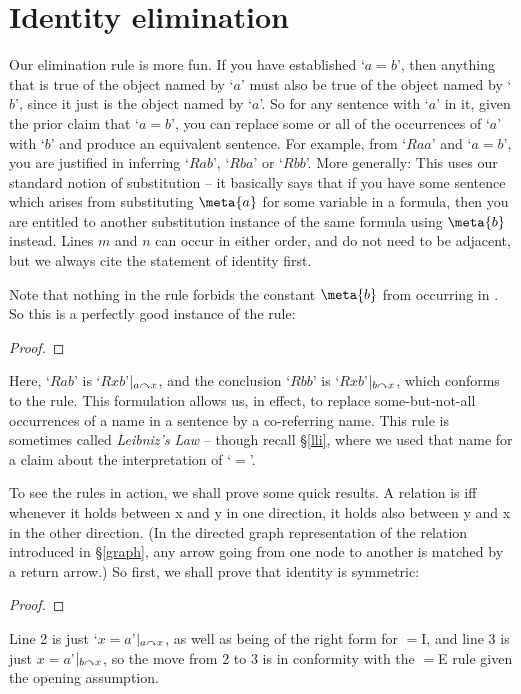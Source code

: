 \section{Identity elimination} %
\label{idelim}


Our elimination rule is more fun. If you have established `$a=b$', then anything that is true of the object named by `$a$' must also be true of the object named by `$b$', since it just is the object named by `$a$'. So for any sentence with `$a$' in it, given the prior claim that `$a=b$', you can replace some or all of the occurrences of `$a$' with `$b$' and produce an equivalent sentence. For example, from `$Raa$' and `$a = b$', you are justified in inferring `$Rab$', `$Rba$' or `$Rbb$'. More generally:
This uses our standard notion of substitution – it basically says that if you have some sentence which arises from substituting $\meta{a}$ for some variable in a formula, then you are entitled to another substitution instance of the same formula using $\meta{b}$ instead. 
 Lines $m$ and $n$ can occur in either order, and do not need to be adjacent, but we always cite the statement of identity first. 

Note that nothing in the rule forbids the constant $\meta{b}$ from occurring in . So this is a perfectly good instance of the rule: \begin{proof}
\end{proof} Here, `$Rab$' is `$Rxb$'$\vert_{a\curvearrowright x}$, and the conclusion `$Rbb$' is `$Rxb$'$\vert_{b\curvearrowright x}$, which conforms to the rule. This formulation allows us, in effect, to replace some-but-not-all occurrences of a name in a sentence by a co-referring name.
This rule is sometimes called \emph{Leibniz's Law} – though recall §\ref{lli}, where we used that name for a claim about the interpretation of `$=$'.


To see the rules in action, we shall prove some quick results. A relation is   iff whenever it holds between x and y in one direction, it holds also between y and x in the other direction. (In the directed graph representation of the relation introduced in §\ref{graph}, any arrow going from one node to another is matched by a return arrow.) So first, we shall prove that identity is symmetric:
\begin{proof}
	\open
		\idi{}
	\close
\end{proof}
Line 2 is just `$x=a$'$\vert_{a\curvearrowright x}$, as well as being of the right form for $=$I, and line 3 is just $x=a$'$\vert_{b\curvearrowright x}$, so the move from 2 to 3 is in conformity with the $=$E rule given the opening assumption.

